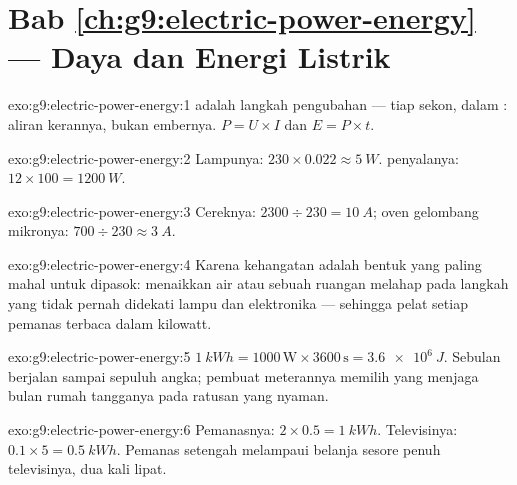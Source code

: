 \section*{Bab \ref{ch:g9:electric-power-energy} --- Daya dan Energi Listrik}

\begin{solution}{exo:g9:electric-power-energy:1}
 adalah langkah pengubahan  ---  tiap sekon, dalam
: aliran kerannya, bukan embernya. $P = U \times I$
dan $E = P \times t$.
\end{solution}

\begin{solution}{exo:g9:electric-power-energy:2}
Lampunya: $230 \times 0.022 \approx \qty{5}{W}$.  penyalanya: $12
\times 100 = \qty{1200}{W}$.
\end{solution}

\begin{solution}{exo:g9:electric-power-energy:3}
Cereknya: $2300 \div 230 = \qty{10}{A}$; oven gelombang mikronya: $700 \div
230 \approx \qty{3}{A}$.
\end{solution}

\begin{solution}{exo:g9:electric-power-energy:4}
Karena kehangatan adalah bentuk  yang paling mahal untuk
dipasok: menaikkan  air atau  sebuah ruangan melahap 
pada langkah yang tidak pernah didekati lampu dan elektronika ---
sehingga pelat setiap pemanas terbaca dalam kilowatt.
\end{solution}

\begin{solution}{exo:g9:electric-power-energy:5}
$\qty{1}{kWh} = 1000 \, \text{W} \times 3600 \, \text{s} =
\qty{3.6e6}{J}$. Sebulan  berjalan sampai sepuluh angka;
pembuat meterannya memilih  yang menjaga bulan rumah tangganya
pada ratusan yang nyaman.
\end{solution}

\begin{solution}{exo:g9:electric-power-energy:6}
Pemanasnya: $2 \times 0.5 = \qty{1}{kWh}$. Televisinya: $0.1
\times 5 = \qty{0.5}{kWh}$. Pemanas setengah  melampaui
belanja sesore penuh televisinya, dua kali lipat.
\end{solution}

